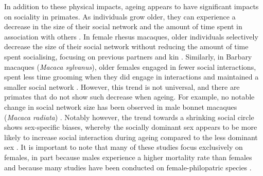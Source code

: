 In addition to these physical impacts, ageing appears to have significant impacts on sociality in primates. As individuals grow older, they can experience a decrease in the size of their social network and the amount of time spent in association with others \citep{Almeling.2017, González.2023}. In female rhesus macaques, older individuals selectively decrease the size of their social network without reducing the amount of time spent socialising, focusing on previous partners and kin \citep{Siracusa.2022}. Similarly, in Barbary macaques (\textit{Macaca sylvanus}), older females engaged in fewer social interactions, spent less time grooming when they did engage in interactions and maintained a smaller social network \citep{Almeling.2016}. However, this trend is not universal, and there are primates that do not show such decrease when ageing. For example, no notable change in social network size has been observed in male bonnet macaques (\textit{Macaca radiata}) \citep{Silk.1994}. Notably however, the trend towards a shrinking social circle shows sex-specific biases, whereby the socially dominant sex appears to be more likely to increase social interaction during ageing compared to the less dominant sex \citep{Corr.2003,Machanda.2020}. It is important to note that many of these studies focus exclusively on females, in part because males experience a higher mortality rate than females and because many studies have been conducted on female-philopatric species \citep{Machanda.2020}.
